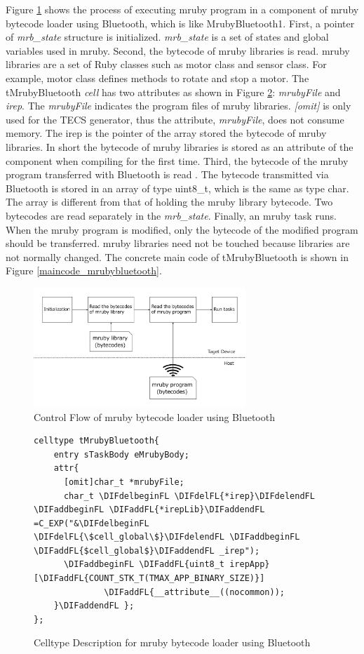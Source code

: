 \documentclass[conference,compsoc]{IEEEtran}
\providecommand{\DIFadd}[1]{{\protect\color{blue}\uwave{#1}}} %
\providecommand{\DIFdel}[1]{{\protect\color{red}\sout{#1}}}                      %
\providecommand{\DIFaddFL}[1]{\DIFadd{#1}} %
\providecommand{\DIFdelFL}[1]{\DIFdel{#1}} %
\providecommand{\DIFaddbeginFL}{} %
\providecommand{\DIFaddendFL}{} %
\providecommand{\DIFdelbeginFL}{} %
\providecommand{\DIFdelendFL}{} %
\begin{document}
Figure \ref{fig:control_flow} shows the process of executing mruby program in a component of mruby bytecode loader using Bluetooth, which is like MrubyBluetooth1.
First, a pointer of {\it mrb\_state} structure is initialized.
{\it mrb\_state} is a set of states and global variables used in mruby.
Second, the bytecode of mruby libraries is read.
mruby libraries are a set of Ruby classes such as motor class and sensor class.
For example, motor class defines methods to rotate and stop a motor.
The tMrubyBluetooth {\it cell} has two attributes as shown in Figure \ref{celltype_mrubybluetooth}: {\it mrubyFile} and {\it irep}.
The {\it mrubyFile} indicates the program files of mruby libraries.
{\it [omit]} is only used for the TECS generator, thus the attribute, {\it mrubyFile}, does not consume memory.
The irep is the pointer of the array stored the bytecode of mruby libraries.
In short the bytecode of mruby libraries is stored as an attribute of the component when compiling for the first time.
Third, the bytecode of the mruby program transferred with Bluetooth is read .
The bytecode transmitted via Bluetooth is stored in an array of type uint8\_t, which is the same as type char.
The array is different from that of holding the mruby library bytecode.
Two bytecodes are read separately in the {\it mrb\_state}.
Finally, an mruby task runs.
When the mruby program is modified, only the bytecode of the modified program should be transferred.
mruby libraries need not be touched because libraries are not normally changed.
The concrete main code of tMrubyBluetooth is shown in Figure \ref{maincode_mrubybluetooth}.
\begin{figure}[t]
    \centering
    \includegraphics[width=8cm,clip]{figure/control_flow.pdf}
    \caption{Control Flow of mruby bytecode loader using Bluetooth}
    \label{fig:control_flow}
\end{figure}
\begin{figure}[t]
\centering
\begin{lstlisting}
celltype tMrubyBluetooth{
    entry sTaskBody eMrubyBody;
    attr{
      [omit]char_t *mrubyFile;
      char_t \DIFdelbeginFL \DIFdelFL{*irep}\DIFdelendFL \DIFaddbeginFL \DIFaddFL{*irepLib}\DIFaddendFL =C_EXP("&\DIFdelbeginFL \DIFdelFL{\$cell_global\$}\DIFdelendFL \DIFaddbeginFL \DIFaddFL{$cell_global$}\DIFaddendFL _irep");
      \DIFaddbeginFL \DIFaddFL{uint8_t irepApp}[\DIFaddFL{COUNT_STK_T(TMAX_APP_BINARY_SIZE)}]
              \DIFaddFL{__attribute__((nocommon));
    }\DIFaddendFL };
};
\end{lstlisting}
\caption{Celltype Description for mruby bytecode loader using Bluetooth}
\label{celltype_mrubybluetooth}
\end{figure}
\end{document}
